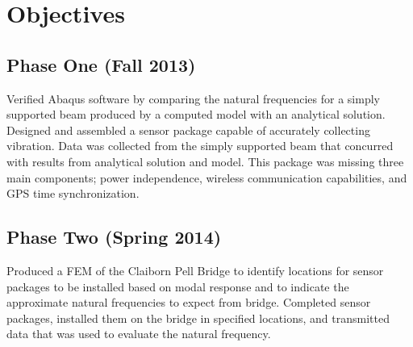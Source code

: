 \section{Objectives}
\subsection{Phase One (Fall 2013)}
\indent Verified Abaqus software by comparing the natural frequencies for a simply supported beam produced by a computed model with an analytical solution. Designed and assembled a sensor package capable of accurately collecting vibration. Data was collected from the simply supported beam that concurred with results from analytical solution and model. This package was missing three main components; power independence, wireless communication capabilities, and GPS time synchronization.\\
\subsection{Phase Two (Spring 2014)}
\indent Produced a FEM of the Claiborn Pell Bridge to identify locations for sensor packages to be installed based on modal response and to indicate the approximate natural frequencies to expect from bridge. Completed sensor packages, installed them on the bridge in specified locations, and transmitted data that was used to evaluate the natural frequency.\\